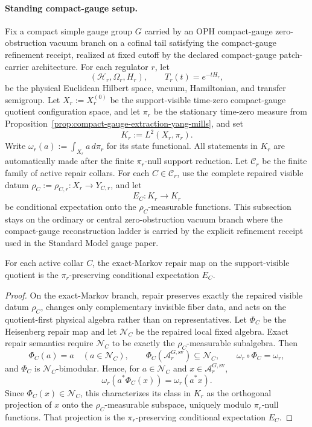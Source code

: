 \paragraph{Standing compact-gauge setup.}
Fix a compact simple gauge group \(G\) carried by an OPH compact-gauge zero-obstruction vacuum
branch on a cofinal tail satisfying the compact-gauge refinement receipt, realized
at fixed cutoff by the declared compact-gauge patch-carrier architecture. For
each regulator \(r\), let
\[
(\mathcal H_r,\Omega_r,H_r),\qquad T_r(t)=e^{-tH_r},
\]
be the physical Euclidean Hilbert space, vacuum, Hamiltonian, and transfer semigroup. Let
\(X_r:=X_r^{(0)}\) be the support-visible time-zero compact-gauge quotient configuration space,
and let \(\pi_r\) be the stationary time-zero measure from
Proposition~\ref{prop:compact-gauge-extraction-yang-mills}, and set
\[
K_r:=L^2(X_r,\pi_r).
\]
Write \(\omega_r(a):=\int_{X_r}a\,d\pi_r\) for its state functional. All statements in \(K_r\)
are automatically made after the finite \(\pi_r\)-null support reduction.
Let \(\mathcal C_r\) be the finite family of active repair collars. For each
\(C\in\mathcal C_r\), use the complete repaired visible datum
\(\rho_C:=\rho_{C,r}:X_r\to Y_{C,r}\), and let
\[
E_C:K_r\to K_r
\]
be conditional expectation onto the \(\rho_C\)-measurable functions. This subsection stays on the
ordinary or central zero-obstruction vacuum branch where the compact-gauge reconstruction ladder is
carried by the explicit refinement receipt used in the Standard Model gauge paper.

\begin{proposition}
\label{prop:sv-repair-expectation}
For each active collar \(C\), the exact-Markov repair map on the support-visible quotient is the
\(\pi_r\)-preserving conditional expectation \(E_C\).
\end{proposition}

\begin{proof}
On the exact-Markov branch, repair preserves exactly the repaired visible datum \(\rho_C\), changes
only complementary invisible fiber data, and acts on the quotient-first physical algebra rather
than on representatives. Let \(\Phi_C\) be the Heisenberg repair map and let \(\mathcal N_C\) be
the repaired local fixed algebra. Exact repair semantics require
\(\mathcal N_C\) to be exactly the \(\rho_C\)-measurable subalgebra. Then
\[
\Phi_C(a)=a\quad(a\in\mathcal N_C),\qquad
\Phi_C(\mathcal A_r^{G,\mathrm{sv}})\subseteq\mathcal N_C,\qquad
\omega_r\circ\Phi_C=\omega_r,
\]
and \(\Phi_C\) is \(\mathcal N_C\)-bimodular. Hence, for
\(a\in\mathcal N_C\) and \(x\in\mathcal A_r^{G,\mathrm{sv}}\),
\[
\omega_r\!\left(a^*\Phi_C(x)\right)=\omega_r(a^*x).
\]
Since \(\Phi_C(x)\in\mathcal N_C\), this characterizes its class in \(K_r\) as the orthogonal
projection of \(x\) onto the \(\rho_C\)-measurable subspace, uniquely modulo \(\pi_r\)-null
functions. That projection is the \(\pi_r\)-preserving conditional expectation \(E_C\).
\end{proof}

